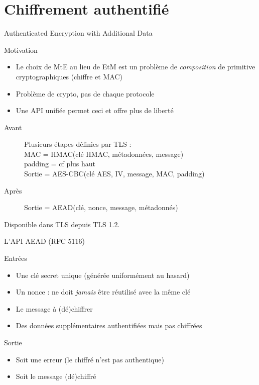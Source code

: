 \documentclass{mpg-ep-slides}
\begin{document}

\section[AEAD]{Chiffrement authentifié}
\tocsect

\begin{frame}{Authenticated Encryption with Additional Data}
  \begin{block}{Motivation}
    \begin{itemize}
      \item Le choix de MtE au lieu de EtM est un problème de
        \emph{composition} de primitive cryptographiques (chiffre et MAC)
      \item Problème de crypto, pas de chaque protocole
      \item Une API unifiée permet ceci et offre plus de liberté
    \end{itemize}
  \end{block}

  \begin{description}
    \item[Avant] Plusieurs étapes définies par TLS :\\
      MAC = HMAC(clé HMAC, métadonnées, message)\\
      padding = cf plus haut\\
      Sortie = AES-CBC(clé AES, IV, message, MAC, padding)\\
    \item[Après] Sortie = AEAD(clé, nonce, message, métadonnés)
  \end{description}

  Disponible dans TLS depuis TLS 1.2.
\end{frame}

\begin{frame}{L'API AEAD (RFC 5116)}
  \begin{block}{Entrées}
    \begin{itemize}
      \item Une clé secret unique (générée uniformément au hasard)
      \item Un nonce : ne doit \emph{jamais} être réutilisé avec la même clé
      \item Le message à (dé)chiffrer
      \item Des données supplémentaires authentifiées mais pas chiffrées
    \end{itemize}
  \end{block}
  \begin{block}{Sortie}
    \begin{itemize}
      \item Soit une erreur (le chiffré n'est pas authentique)
      \item Soit le message (dé)chiffré
    \end{itemize}
  \end{block}
\end{frame}
\end{document}
